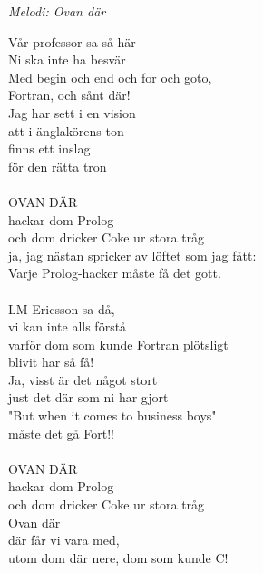 {\footnotesize\textit{Melodi: Ovan där}}\par
\vspace{10pt}
Vår professor sa så här\\
Ni ska inte ha besvär\\
Med begin och end och for och goto,\\
Fortran, och sånt där!\\
Jag har sett i en vision\\
att i änglakörens ton\\
finns ett inslag\\
för den rätta tron\\
\\
OVAN DÄR\\
hackar dom Prolog\\
och dom dricker Coke ur stora tråg\\
ja, jag nästan spricker av löftet som jag fått:\\
Varje Prolog-hacker måste få det gott.\\
\\
LM Ericsson sa då,\\
vi kan inte alls förstå\\
varför dom som kunde Fortran plötsligt\\
blivit har så få!\\
Ja, visst är det något stort\\
just det där som ni har gjort\\
"But when it comes to business boys"\\
måste det gå Fort!!\\
\\
OVAN DÄR\\
hackar dom Prolog\\
och dom dricker Coke ur stora tråg\\
Ovan där\\
där får vi vara med,\\
utom dom där nere, dom som kunde C!
